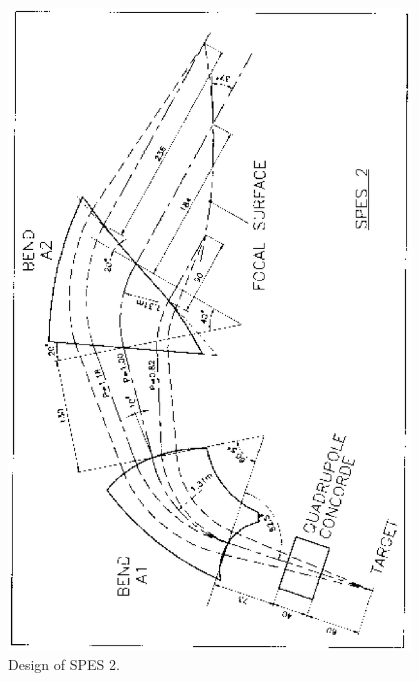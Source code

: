 \begin{figure}[H]
\centerline{\includegraphics[height=17cm,angle=-90]{FigC1-1.eps}}
\caption{\label{figC11}Design of SPES 2.}
\end{figure}

\vfill 

